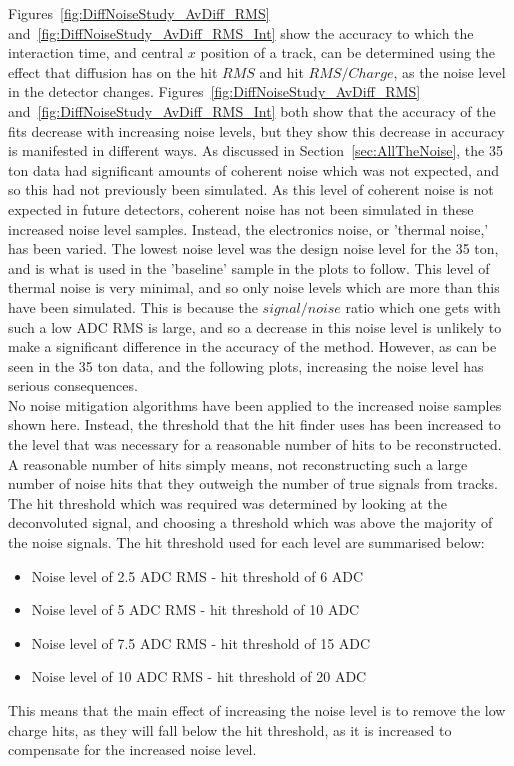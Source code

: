 Figures~\ref{fig:DiffNoiseStudy_AvDiff_RMS} and~\ref{fig:DiffNoiseStudy_AvDiff_RMS_Int} show the accuracy to which the interaction time, and central $x$ position of a track, can be determined using the effect that diffusion has on the hit $RMS$ and hit $RMS/Charge$, as the noise level in the detector changes. Figures~\ref{fig:DiffNoiseStudy_AvDiff_RMS} and~\ref{fig:DiffNoiseStudy_AvDiff_RMS_Int} both show that the accuracy of the fits decrease with increasing noise levels, but they show this decrease in accuracy is manifested in different ways. As discussed in Section~\ref{sec:AllTheNoise}, the 35 ton data had significant amounts of coherent noise which was not expected, and so this had not previously been simulated. As this level of coherent noise is not expected in future detectors, coherent noise has not been simulated in these increased noise level samples. Instead, the electronics noise, or 'thermal noise,' has been varied. The lowest noise level was the design noise level for the 35 ton, and is what is used in the 'baseline' sample in the plots to follow. This level of thermal noise is very minimal, and so only noise levels which are more than this have been simulated. This is because the $signal/noise$ ratio which one gets with such a low ADC RMS is large, and so a decrease in this noise level is unlikely to make a significant difference in the accuracy of the method. However, as can be seen in the 35 ton data, and the following plots, increasing the noise level has serious consequences. \\

No noise mitigation algorithms have been applied to the increased noise samples shown here. Instead, the threshold that the hit finder uses has been increased to the level that was necessary for a reasonable number of hits to be reconstructed. A reasonable number of hits simply means, not reconstructing such a large number of noise hits that they outweigh the number of true signals from tracks. The hit threshold which was required was determined by looking at the deconvoluted signal, and choosing a threshold which was above the majority of the noise signals. The hit threshold used for each level are summarised below:
\begin{itemize}
\item Noise level of 2.5 ADC RMS - hit threshold of 6 ADC
\item Noise level of 5 ADC RMS - hit threshold of 10 ADC
\item Noise level of 7.5 ADC RMS - hit threshold of 15 ADC
\item Noise level of 10 ADC RMS - hit threshold of 20 ADC
\end{itemize}
This means that the main effect of increasing the noise level is to remove the low charge hits, as they will fall below the hit threshold, as it is increased to compensate for the increased noise level. \\

